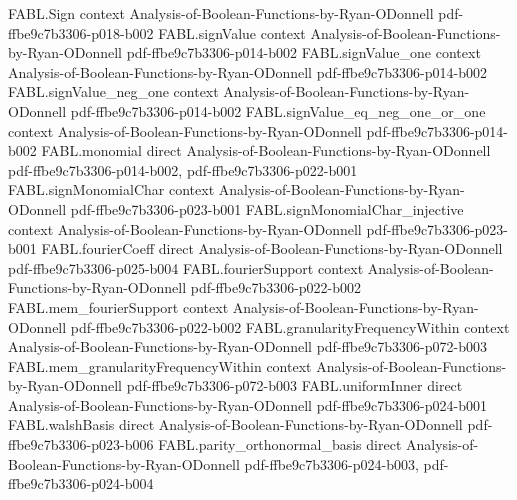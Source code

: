 \begin{theorem}
\label{FABL.bentkusWhitening_norm_oppositeSigns_le}
\leanok
{}
\proofstep
  {FABL.Sign}
  {context}
  {Analysis-of-Boolean-Functions-by-Ryan-ODonnell}
  {pdf-ffbe9c7b3306-p018-b002}
\proofstep
  {FABL.signValue}
  {context}
  {Analysis-of-Boolean-Functions-by-Ryan-ODonnell}
  {pdf-ffbe9c7b3306-p014-b002}
\proofstep
  {FABL.signValue_one}
  {context}
  {Analysis-of-Boolean-Functions-by-Ryan-ODonnell}
  {pdf-ffbe9c7b3306-p014-b002}
\proofstep
  {FABL.signValue_neg_one}
  {context}
  {Analysis-of-Boolean-Functions-by-Ryan-ODonnell}
  {pdf-ffbe9c7b3306-p014-b002}
\proofstep
  {FABL.signValue_eq_neg_one_or_one}
  {context}
  {Analysis-of-Boolean-Functions-by-Ryan-ODonnell}
  {pdf-ffbe9c7b3306-p014-b002}
\proofstep
  {FABL.monomial}
  {direct}
  {Analysis-of-Boolean-Functions-by-Ryan-ODonnell}
  {pdf-ffbe9c7b3306-p014-b002,
    pdf-ffbe9c7b3306-p022-b001}
\proofstep
  {FABL.signMonomialChar}
  {context}
  {Analysis-of-Boolean-Functions-by-Ryan-ODonnell}
  {pdf-ffbe9c7b3306-p023-b001}
\proofstep
  {FABL.signMonomialChar_injective}
  {context}
  {Analysis-of-Boolean-Functions-by-Ryan-ODonnell}
  {pdf-ffbe9c7b3306-p023-b001}
\proofstep
  {FABL.fourierCoeff}
  {direct}
  {Analysis-of-Boolean-Functions-by-Ryan-ODonnell}
  {pdf-ffbe9c7b3306-p025-b004}
\proofstep
  {FABL.fourierSupport}
  {context}
  {Analysis-of-Boolean-Functions-by-Ryan-ODonnell}
  {pdf-ffbe9c7b3306-p022-b002}
\proofstep
  {FABL.mem_fourierSupport}
  {context}
  {Analysis-of-Boolean-Functions-by-Ryan-ODonnell}
  {pdf-ffbe9c7b3306-p022-b002}
\proofstep
  {FABL.granularityFrequencyWithin}
  {context}
  {Analysis-of-Boolean-Functions-by-Ryan-ODonnell}
  {pdf-ffbe9c7b3306-p072-b003}
\proofstep
  {FABL.mem_granularityFrequencyWithin}
  {context}
  {Analysis-of-Boolean-Functions-by-Ryan-ODonnell}
  {pdf-ffbe9c7b3306-p072-b003}
\proofstep
  {FABL.uniformInner}
  {direct}
  {Analysis-of-Boolean-Functions-by-Ryan-ODonnell}
  {pdf-ffbe9c7b3306-p024-b001}
\proofstep
  {FABL.walshBasis}
  {direct}
  {Analysis-of-Boolean-Functions-by-Ryan-ODonnell}
  {pdf-ffbe9c7b3306-p023-b006}
\proofstep
  {FABL.parity_orthonormal_basis}
  {direct}
  {Analysis-of-Boolean-Functions-by-Ryan-ODonnell}
  {pdf-ffbe9c7b3306-p024-b003,
    pdf-ffbe9c7b3306-p024-b004}

\end{theorem}
